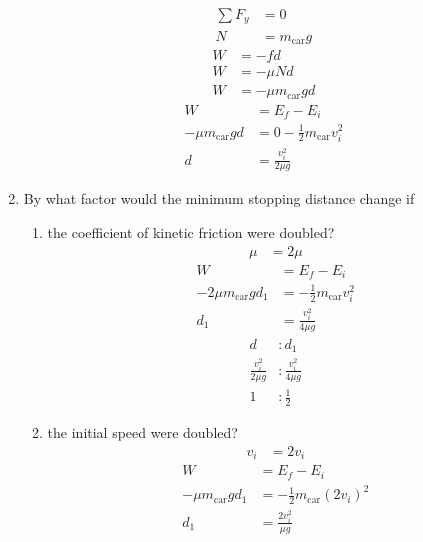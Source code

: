 \documentclass{article}
\begin{document}
\begin{enumerate}[label = \textbf{(\alph*)}]
		\begin{align*}
			\sum F_y & = 0 \\
			N & = m_\text{car}g
		\end{align*}
		\begin{align*}
			W & = -fd \\
			W & = -\mu Nd \\
			W & = -\mu m_\text{car}gd
		\end{align*}
		\begin{align*}
			W & = E_f - E_i \\
			-\mu m_\text{car}gd & = 0 - \frac{1}{2}m_\text{car}v_i^2 \\
			d & = \frac{v_i^2}{2\mu g}
		\end{align*}
	\item By what factor would the minimum stopping distance change if
		\begin{enumerate}[label = \textbf{(\roman*)}]
			\item \label{6.31.b.i} the coefficient of kinetic friction were doubled?
				\begin{align*}
					\mu & = 2\mu
				\end{align*}
				\begin{align*}
					W & = E_f - E_i \\
					-2\mu m_\text{car}gd_1 & = -\frac{1}{2}m_\text{car}v_i^2 \\
					d_1 & = \frac{v_i^2}{4\mu g}
				\end{align*}
				\begin{align*}
					d & : d_1 \\
					\frac{v_i^2}{2\mu g} & : \frac{v_i^2}{4\mu g} \\
					1 & : \frac{1}{2}
				\end{align*}
			\item \label{6.31.b.ii} the initial speed were doubled?
				\begin{align*}
					v_i & = 2v_i
				\end{align*}
				\begin{align*}
					W & = E_f - E_i \\
					-\mu m_\text{car}gd_1 & = -\frac{1}{2}m_\text{car}(2v_i)^2 \\
					d_1 & = \frac{2v_i^2}{\mu g}
				\end{align*}
				\begin{align*}

\end{align*}
\end{enumerate}
\end{enumerate}
\end{document}

